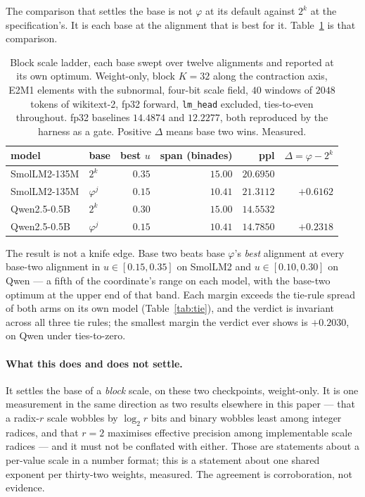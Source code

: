 \documentclass[11pt]{article}
\theoremstyle{definition}
\begin{document}
The comparison that settles the base is not $\varphi$ at its default against
$2^{k}$ at the specification's. It is each base at the alignment that is best
for it. Table~\ref{tab:bestalign} is that comparison.

\begin{table}[t]\centering
\caption{Block scale ladder, each base swept over twelve alignments and reported
at its own optimum. Weight-only, block $K=32$ along the contraction axis, E2M1
elements with the subnormal, four-bit scale field, $40$ windows of $2048$ tokens
of wikitext-2, fp32 forward, \texttt{lm\_head} excluded, ties-to-even
throughout. fp32 baselines $14.4874$ and $12.2277$, both reproduced by the
harness as a gate. Positive $\Delta$ means base two wins. Measured.}
\label{tab:bestalign}
\begin{tabular}{llrrrr}
\toprule
model & base & best $u$ & span (binades) & ppl & $\Delta = \varphi - 2^{k}$ \\
\midrule
SmolLM2-135M & $2^{k}$       & $0.35$ & $15.00$ & $\mathbf{20.6950}$ & \\
SmolLM2-135M & $\varphi^{j}$ & $0.15$ & $10.41$ & $21.3112$ & $+0.6162$ \\
\addlinespace
Qwen2.5-0.5B & $2^{k}$       & $0.30$ & $15.00$ & $\mathbf{14.5532}$ & \\
Qwen2.5-0.5B & $\varphi^{j}$ & $0.15$ & $10.41$ & $14.7850$ & $+0.2318$ \\
\bottomrule
\end{tabular}
\end{table}

The result is not a knife edge. Base two beats base $\varphi$'s \emph{best}
alignment at every base-two alignment in $u\in[0.15,0.35]$ on SmolLM2 and
$u\in[0.10,0.30]$ on Qwen --- a fifth of the coordinate's range on each model,
with the base-two optimum at the upper end of that band. Each margin exceeds the
tie-rule spread of both arms on its own model (Table~\ref{tab:tie}), and the
verdict is invariant across all three tie rules; the smallest margin the verdict
ever shows is $+0.2030$, on Qwen under ties-to-zero.

\paragraph{What this does and does not settle.} It settles the base of a
\emph{block} scale, on these two checkpoints, weight-only. It is one measurement
in the same direction as two results elsewhere in this paper --- that a radix-$r$
scale wobbles by $\log_2 r$ bits and binary wobbles least among integer radices,
and that $r=2$ maximises effective precision among implementable scale radices
--- and it must not be conflated with either. Those are statements about a
per-value scale in a number format; this is a statement about one shared
exponent per thirty-two weights, measured. The agreement is corroboration, not
evidence.
\end{document}

